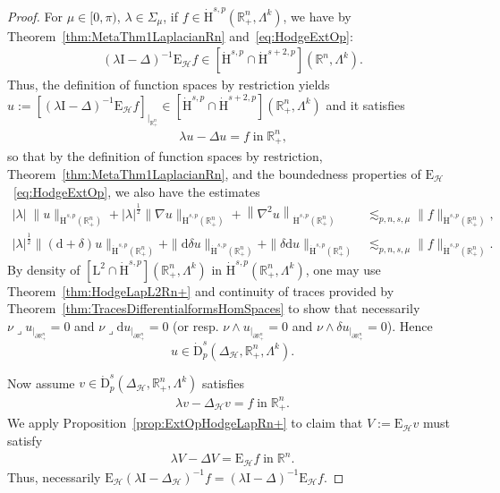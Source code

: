 \documentclass[10pt]{amsart}
\theoremstyle{definition}\newtheorem{defi}[theo]{Definition}\newtheorem{rema}[theo]{Remark}\newtheorem{exam}[theo]{Example}\newtheorem{exem}[theo]{Example}\newtheorem{nota}[theo]{Notation}
\newcommand{\bbR}{\mathbb{R}}
\newcommand{\rmH}{\mathrm{H}}%
\newcommand{\rmd}{\mathrm{d}}
\newcommand{\rmD}{\mathrm{D}}
\newcommand{\rmL}{\mathrm{L}}
\newcommand{\rmE}{\mathrm{E}}
\newcommand{\rmI}{\mathrm{I}}
\newcommand{\clH}{\mathcal{H}}
\newcommand{\iprod}{\mathbin{\lrcorner}}
\begin{document}
\begin{proof}
For $\mu\in[0,\pi)$, $\lambda\in\Sigma_\mu$, if $f\in \dot{\rmH}^{s,p}(\bbR^n_+,\Lambda^k)$, we have by Theorem~\ref{thm:MetaThm1LaplacianRn} and~\eqref{eq:HodgeExtOp}:
\begin{align*}
(\lambda \rmI -\Delta)^{-1}\rmE_{\clH}f \in \left[\dot{\rmH}^{s,p}\cap\dot{\rmH}^{s+2,p}\right]\left(\bbR^n,\Lambda^k\right).
\end{align*}
Thus, the definition of function spaces by restriction yields $u:= [(\lambda \rmI -\Delta)^{-1}\rmE _{\clH}f]_{|_{\bbR^n_+}}\in [\dot{\rmH}^{s,p}\cap\dot{\rmH}^{s+2,p}](\bbR^n_+,\Lambda^k)$ and it satisfies
\begin{align*}
\lambda u -\Delta u =f \;\text{in}\; \bbR^n_+ \text{,}
\end{align*}
so that by the definition of function spaces by restriction, Theorem~\ref{thm:MetaThm1LaplacianRn}, and the boundedness properties of $\rmE_{\clH}$~\eqref{eq:HodgeExtOp}, we also have the estimates
\begin{align*}
|\lambda|\;\| u\|_{\dot{\rmH}^{s,p}\left(\bbR^n_+\right)}+|\lambda|^\frac{1}{2}\| \nabla u\|_{\dot{\rmH}^{s,p}\left(\bbR^n_+\right)}+\left\| \nabla^2 u\right\|_{\dot{\rmH}^{s,p}\left(\bbR^n_+\right)} &\lesssim_{p,n,s,\mu} \| f\|_{\dot{\rmH}^{s,p}\left(\bbR^n_+\right)} ,\\
|\lambda|^\frac{1}{2}\| (\rmd+\delta) u\|_{\dot{\rmH}^{s,p}\left(\bbR^n_+\right)}+\| \rmd\delta u\|_{\dot{\rmH}^{s,p}\left(\bbR^n_+\right)} + \| \delta\rmd u\|_{\dot{\rmH}^{s,p}\left(\bbR^n_+\right)} &\lesssim_{p,n,s,\mu} \| f\|_{\dot{\rmH}^{s,p}\left(\bbR^n_+\right)} .
\end{align*}
By density of $[\rmL^2\cap\dot{\rmH}^{s,p}](\bbR^n_+,\Lambda^k)$ in $\dot{\rmH}^{s,p}(\bbR^n_+,\Lambda^k)$, one may use Theorem~\ref{thm:HodgeLapL2Rn+} and continuity of traces provided by Theorem~\ref{thm:TracesDifferentialformsHomSpaces} to show that necessarily $\nu\iprod u_{|_{\partial\bbR^n_+}}=0$ and $\nu\iprod \rmd u_{|_{\partial\bbR^n_+}}=0$ (or resp. $\nu\wedge u_{|_{\partial\bbR^n_+}}=0$ and $\nu\wedge \delta u_{|_{\partial\bbR^n_+}}=0$). Hence
\[
u\in \dot{\rmD}^{s}_{p}\left(\Delta_{\clH},\bbR^n_+,\Lambda^k\right).
\]

Now assume $v\in \dot{\rmD}^{s}_{p}(\Delta_{\clH},\bbR^n_+,\Lambda^k)$ satisfies
\begin{align*}
\lambda v -\Delta_\clH v =f \;\text{in}\; \bbR^n_+.
\end{align*}
We apply Proposition~\ref{prop:ExtOpHodgeLapRn+} to claim that $V:=\rmE _\clH v$ must satisfy
\begin{align*}
\lambda V -\Delta V = \rmE _{\clH}f \;\text{in}\; \bbR^n.
\end{align*}
Thus, necessarily $\rmE _{\clH}(\lambda \rmI  - \Delta_{\clH})^{-1}f = (\lambda \rmI  - \Delta)^{-1}\rmE_{\clH}f$.



\end{proof}
\end{document}
